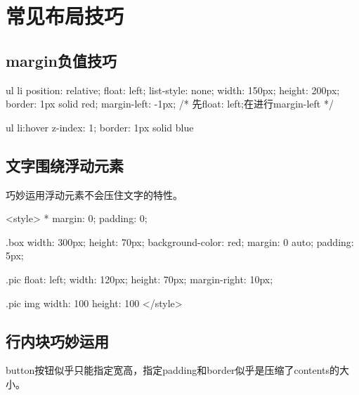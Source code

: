 \section{常见布局技巧}
\subsection{margin负值技巧}
\begin{css}
    ul li {
            position: relative;
            float: left;
            list-style: none;
            width: 150px;
            height: 200px;
            border: 1px solid red;
            margin-left: -1px;
            /* 先float: left;在进行margin-left */
        }

    ul li:hover {
    z-index: 1;
    border: 1px solid blue
    }
\end{css}
\subsection{文字围绕浮动元素}
巧妙运用浮动元素不会压住文字的特性。
\begin{css}
    <style>
    * {
            margin: 0;
            padding: 0;
        }

    .box {
            width: 300px;
            height: 70px;
            background-color: red;
            margin: 0 auto;
            padding: 5px;
        }

    .pic {
            float: left;
            width: 120px;
            height: 70px;
            margin-right: 10px;
        }

    .pic img {
            width: 100%
            height: 100%
        }
    </style>
\end{css}
\subsection{行内块巧妙运用}
button按钮似乎只能指定宽高，指定padding和border似乎是压缩了contents的大小。